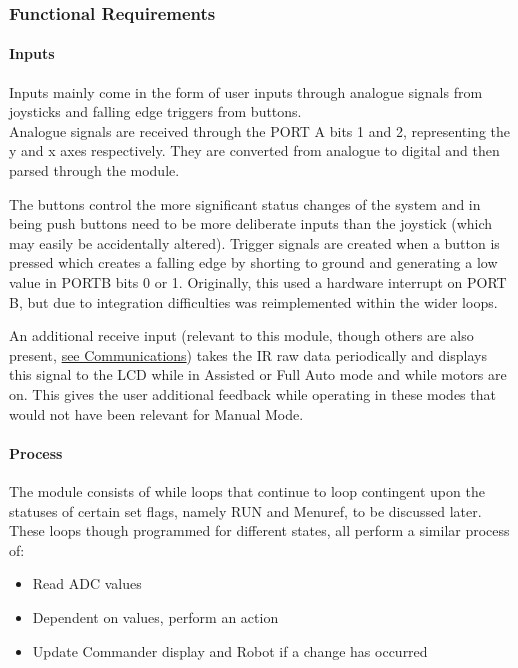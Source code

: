 	
	\subsubsection{Functional Requirements}
	\paragraph{Inputs}
	Inputs mainly come in the form of user inputs through analogue signals from joysticks and falling edge triggers from buttons.\\
	 
	Analogue signals are received through the PORT A bits 1 and 2, representing the y and x axes respectively. They are converted from analogue to digital and then parsed through the module.
	
	The buttons control the more significant status changes of the system and in being push buttons need to be more deliberate inputs than the joystick (which may easily be accidentally altered). Trigger signals are created when a button is pressed which creates a falling edge by shorting to ground and generating a low value in PORTB bits 0 or 1. Originally, this used a hardware interrupt on PORT B, but due to integration difficulties was reimplemented within the wider loops.
	
	An additional receive input (relevant to this module, though others are also present, \underline{see Communications}) takes the IR raw data periodically and displays this signal to the LCD while in Assisted or Full Auto mode and while motors are on. This gives the user additional feedback while operating in these modes that would not have been relevant for Manual Mode. 
	
	
	\paragraph{Process}
		
	The module consists of while loops that continue to loop contingent upon the statuses of certain set flags, namely RUN and Menu\textunderscore ref, to be discussed later. These loops though programmed for different states, all perform a similar process of:
	\begin{itemize}
		\item Read ADC values
		\item Dependent on values, perform an action
		\item Update Commander display and Robot if a change has occurred
	\end{itemize}
	

